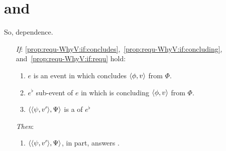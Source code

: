 \section{ and \qWhyV{}}
\label{cha:binding:sec:requ-qWhyV}

\begin{note}
  \questionWhyV*

  So, dependence.

  \begin{proposition}
    \label{prop:requ-WhyV}

    \begin{itemize}
    \item[\emph{If}:]
      \ref{prop:requ-WhyV:if:concludes},~\ref{prop:requ-WhyV:if:concluding}, and~\ref{prop:requ-WhyV:if:requ} hold:
      \begin{enumerate}[label=\alph*., ref=(\alph*), series=propRequWhyVSeries]
      \item
        \label{prop:requ-WhyV:if:concludes}
        \(e\) is an event in which \vAgent{} concludes \(\langle \phi, v \rangle\) from \(\Phi\).
      \item
        \label{prop:requ-WhyV:if:concluding}
        \(e^{\flat}\) sub-event of \(e\) in which \vAgent{} is concluding \(\langle \phi, v \rangle\) from \(\Phi\).
      \item
        \label{prop:requ-WhyV:if:requ}
        \(\langle \langle \psi, v' \rangle, \Psi \rangle\) is a \requ{} of \(e^{\flat}\)
      \end{enumerate}
    \item[\emph{Then}:]
      \begin{enumerate}[label=\alph*., ref=(\alph*), resume*=propRequWhyVSeries]
      \item
        \label{prop:requ-WhyV:tn:answer}
        \(\langle \langle \psi, v' \rangle, \Psi \rangle\), in part, answers \qWhyV{}.
      \end{enumerate}
    \end{itemize}
    \vspace{-\baselineskip}
  \end{proposition}


\end{note}
